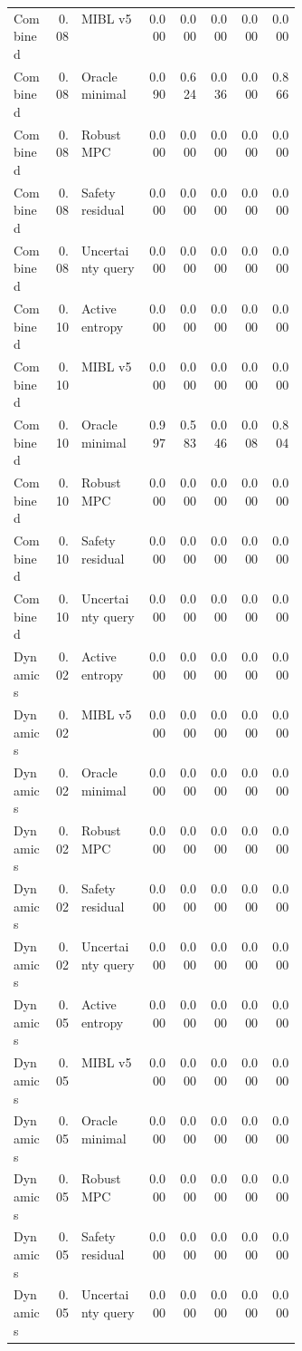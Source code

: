 \documentclass{article}
\begin{document}
\begin{center}
\begin{longtable}{p{0.14\linewidth}rp{0.23\linewidth}rrrrr}
Combined & 0.08 & MIBL v5 & 0.000 & 0.000 & 0.000 & 0.000 & 0.000\\
Combined & 0.08 & Oracle minimal & 0.090 & 0.624 & 0.036 & 0.000 & 0.866\\
Combined & 0.08 & Robust MPC & 0.000 & 0.000 & 0.000 & 0.000 & 0.000\\
Combined & 0.08 & Safety residual & 0.000 & 0.000 & 0.000 & 0.000 & 0.000\\
Combined & 0.08 & Uncertainty query & 0.000 & 0.000 & 0.000 & 0.000 & 0.000\\
Combined & 0.10 & Active entropy & 0.000 & 0.000 & 0.000 & 0.000 & 0.000\\
Combined & 0.10 & MIBL v5 & 0.000 & 0.000 & 0.000 & 0.000 & 0.000\\
Combined & 0.10 & Oracle minimal & 0.997 & 0.583 & 0.046 & 0.008 & 0.804\\
Combined & 0.10 & Robust MPC & 0.000 & 0.000 & 0.000 & 0.000 & 0.000\\
Combined & 0.10 & Safety residual & 0.000 & 0.000 & 0.000 & 0.000 & 0.000\\
Combined & 0.10 & Uncertainty query & 0.000 & 0.000 & 0.000 & 0.000 & 0.000\\
Dynamics & 0.02 & Active entropy & 0.000 & 0.000 & 0.000 & 0.000 & 0.000\\
Dynamics & 0.02 & MIBL v5 & 0.000 & 0.000 & 0.000 & 0.000 & 0.000\\
Dynamics & 0.02 & Oracle minimal & 0.000 & 0.000 & 0.000 & 0.000 & 0.000\\
Dynamics & 0.02 & Robust MPC & 0.000 & 0.000 & 0.000 & 0.000 & 0.000\\
Dynamics & 0.02 & Safety residual & 0.000 & 0.000 & 0.000 & 0.000 & 0.000\\
Dynamics & 0.02 & Uncertainty query & 0.000 & 0.000 & 0.000 & 0.000 & 0.000\\
Dynamics & 0.05 & Active entropy & 0.000 & 0.000 & 0.000 & 0.000 & 0.000\\
Dynamics & 0.05 & MIBL v5 & 0.000 & 0.000 & 0.000 & 0.000 & 0.000\\
Dynamics & 0.05 & Oracle minimal & 0.000 & 0.000 & 0.000 & 0.000 & 0.000\\
Dynamics & 0.05 & Robust MPC & 0.000 & 0.000 & 0.000 & 0.000 & 0.000\\
Dynamics & 0.05 & Safety residual & 0.000 & 0.000 & 0.000 & 0.000 & 0.000\\
Dynamics & 0.05 & Uncertainty query & 0.000 & 0.000 & 0.000 & 0.000 & 0.000\\

\end{longtable}
\end{center}
\end{document}
